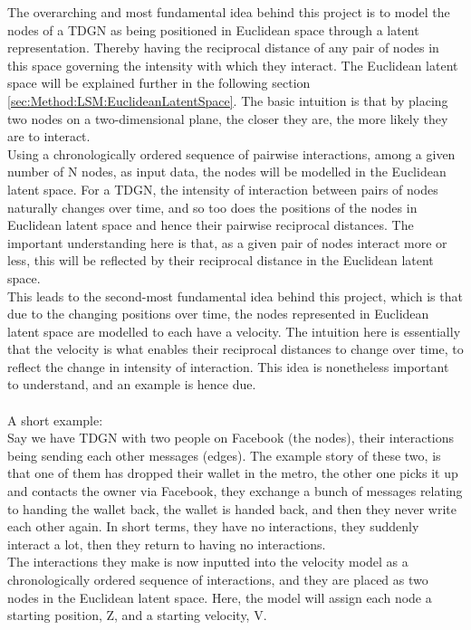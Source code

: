 The overarching and most fundamental idea behind this project is to model the nodes of a TDGN as being positioned in Euclidean space through a latent representation. Thereby having the reciprocal distance of any pair of nodes in this space governing the intensity with which they interact.
The Euclidean latent space will be explained further in the following section  \ref{sec:Method:LSM:EuclideanLatentSpace}. The basic intuition is that by placing two nodes on a two-dimensional plane, the closer they are, the more likely they are to interact.
\\
Using a chronologically ordered sequence of pairwise interactions, among a given number of N nodes, as input data, the nodes will be modelled in the Euclidean latent space.
For a TDGN, the intensity of interaction between pairs of nodes naturally changes over time, and so too does the positions of the nodes in Euclidean latent space and hence their pairwise reciprocal distances.
The important understanding here is that, as a given pair of nodes interact more or less, this will be reflected by their reciprocal distance in the Euclidean latent space.
\\
This leads to the second-most fundamental idea behind this project, which is that due to the changing positions over time, the nodes represented in Euclidean latent space are modelled to each have a velocity. 
The intuition here is essentially that the velocity is what enables their reciprocal distances to change over time, to reflect the change in intensity of interaction.
This idea is nonetheless important to understand, and an example is hence due. 
\\\\
A short example:
\\
Say we have TDGN with two people on Facebook (the nodes), their interactions being sending each other messages (edges). 
The example story of these two, is that one of them has dropped their wallet in the metro, the other one picks it up and contacts the owner via Facebook, they exchange a bunch of messages relating to handing the wallet back, the wallet is handed back, and then they never write each other again.
In short terms, they have no interactions, they suddenly interact a lot, then they return to having no interactions.
\\
The interactions they make is now inputted into the velocity model as a chronologically ordered sequence of interactions, and they are placed as two nodes in the Euclidean latent space.
Here, the model will assign each node a starting position, Z, and a starting velocity, V. 
